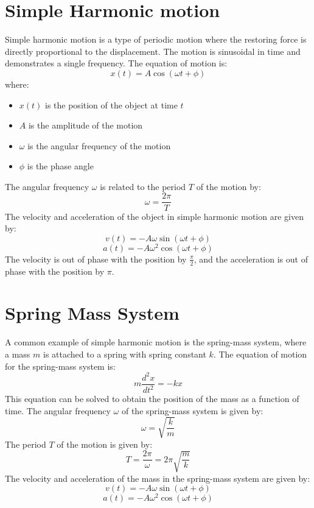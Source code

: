 \documentclass[11pt]{article}
\begin{document}
\section{Simple Harmonic motion}
    Simple harmonic motion is a type of periodic motion where the restoring force is directly proportional to the displacement.
    The motion is sinusoidal in time and demonstrates a single frequency. The equation of motion is:
    \[x(t) = A \cos(\omega t + \phi)\]
    where:
    \begin{itemize}
        \item $x(t)$ is the position of the object at time $t$
        \item $A$ is the amplitude of the motion
        \item $\omega$ is the angular frequency of the motion
        \item $\phi$ is the phase angle
    \end{itemize}
    The angular frequency $\omega$ is related to the period $T$ of the motion by:
    \[\omega = \frac{2\pi}{T}\]
    The velocity and acceleration of the object in simple harmonic motion are given by:
    \[v(t) = -A\omega \sin(\omega t + \phi)\]
    \[a(t) = -A\omega^2 \cos(\omega t + \phi)\]
    The velocity is out of phase with the position by $\frac{\pi}{2}$, and the acceleration is out of phase with the position by $\pi$.
\section{Spring Mass System}
    A common example of simple harmonic motion is the spring-mass system, where a mass $m$ is attached to a spring with spring constant $k$.
    The equation of motion for the spring-mass system is:
    \[m\frac{d^2x}{dt^2} = -kx\]
    This equation can be solved to obtain the position of the mass as a function of time.
    The angular frequency $\omega$ of the spring-mass system is given by:
    \[\omega = \sqrt{\frac{k}{m}}\]
    The period $T$ of the motion is given by:
    \[T = \frac{2\pi}{\omega} = 2\pi\sqrt{\frac{m}{k}}\]
    The velocity and acceleration of the mass in the spring-mass system are given by:
    \[v(t) = -A\omega \sin(\omega t + \phi)\]
    \[a(t) = -A\omega^2 \cos(\omega t + \phi)\]
\end{document}
